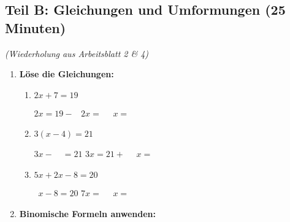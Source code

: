 \subsection*{Teil B: Gleichungen und Umformungen (25 Minuten)}
\textit{(Wiederholung aus Arbeitsblatt 2 \& 4)}

\begin{enumerate}[label=\arabic*., resume]

    \item \textbf{Löse die Gleichungen:}

    \vspace{0.5cm}

    \begin{enumerate}[label=\alph*)]
        \item $2x + 7 = 19$

        \vspace{0.3cm}
        $2x = 19 - \phantom{0}$
        \vspace{0.3cm}
        $2x = \phantom{00}$
        \vspace{0.3cm}
        $x = $ \underline{\hspace{2cm}}

        \vspace{0.5cm}

        \item $3(x - 4) = 21$

        \vspace{0.3cm}
        $3x - \phantom{00} = 21$
        \vspace{0.3cm}
        $3x = 21 + \phantom{00}$
        \vspace{0.3cm}
        $x = $ \underline{\hspace{2cm}}

        \vspace{0.5cm}

        \item $5x + 2x - 8 = 20$

        \vspace{0.3cm}
        $\phantom{0}x - 8 = 20$
        \vspace{0.3cm}
        $7x = \phantom{00}$
        \vspace{0.3cm}
        $x = $ \underline{\hspace{2cm}}

    \end{enumerate}

    \vspace{1cm}

    \item \textbf{Binomische Formeln anwenden:}


\end{enumerate}
